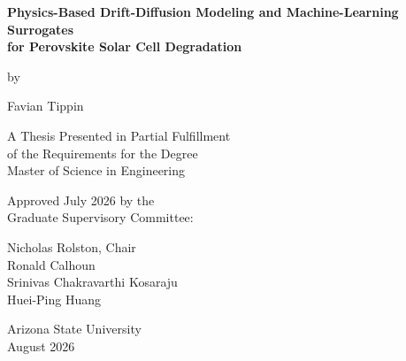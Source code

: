 \begin{titlepage}
\thispagestyle{empty}
\begin{singlespace}
\centering

\vspace*{0.35in}

{\Large\bfseries
Physics-Based Drift-Diffusion Modeling and Machine-Learning Surrogates\\
for Perovskite Solar Cell Degradation\par}

\vspace{0.55in}

by

\vspace{0.15in}

{\Large Favian Tippin\par}

\vspace{0.55in}

A Thesis Presented in Partial Fulfillment\\
of the Requirements for the Degree\\
Master of Science in Engineering

\vspace{0.55in}

Approved July 2026 by the\\
Graduate Supervisory Committee:

\vspace{0.25in}

Nicholas Rolston, Chair\\
Ronald Calhoun\\
Srinivas Chakravarthi Kosaraju\\
Huei-Ping Huang

\vfill

Arizona State University\\
August 2026

\end{singlespace}
\end{titlepage}
\clearpage
